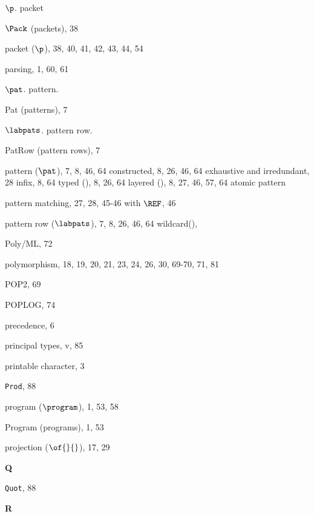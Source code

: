 \begin{theindex}
\item $\p$. \see packet 
\item $\Pack$ (packets), 38
\item packet ($\p$), 38, 40, 41, 42, 43, 44, 54
\item parsing, 1, 60, 61
\item $\pat$. \see pattern.
\item Pat (patterns), 7
\item $\labpats$. \see pattern row.
\item PatRow (pattern rows), 7
\item pattern ($\pat$), 7, 8, 46, 64
\subitem constructed, 8, 26, 46, 64
\subitem exhaustive and irredundant, 28
\subitem infix, 8, 64
\subitem typed (\boxml{:}), 8, 26, 64
\subitem layered (), 8, 27, 46, 57, 64
\subitem \seealso atomic pattern
\item pattern matching, 27, 28, 45-46
\subitem with $\REF$, 46
\item pattern row ($\labpats$), 7, 8, 26, 46, 64
\subitem wildcard(), \dotdotdotrefs
\item Poly/ML, 72
\item polymorphism, 18, 19, 20, 21, 23, 24, 26, 30, 69-70, 71, 81 
\item POP2, 69
\item POPLOG, 74
\item precedence, 6
\item principal types, v, 85
\item printable character, 3
\item {\tt Prod}, 88
\item program ($\program$), 1, 53, 58
\item Program (programs), 1, 53
\item projection ($\of{}{}$), 17, 29
\indexspace

\parbox{64mm}{\hfil{\large\bf Q}\hfil}

\indexspace

\item {\tt Quot}, 88
\indexspace

\parbox{64mm}{\hfil{\large\bf R}\hfil}

\indexspace


\end{theindex}
